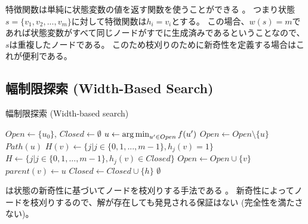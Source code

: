 特徴関数は単純に状態変数の値を返す関数を使うことができる \cite{geffner2015, lipovetzky2015a}。
つまり状態$s = \{v_1, v_2,...,v_m\}$に対して特徴関数は$h_i = v_i$とする。
この場合、$w(s) = m$であれば状態変数がすべて同じノードがすでに生成済みであるということなので、$s$は重複したノードである。
このため枝刈りのために新奇性を定義する場合はこれが便利である。



\subsection{幅制限探索 (Width-Based Search)}
\label{sec:width-based-search}


\begin{algorithm}
\caption{幅制限探索 (Width-based search)}
\label{alg:width-based-search}
	$Open \leftarrow \{u_0\}$, $Closed \leftarrow \emptyset$\;
	 {
                $u \leftarrow \operatorname*{arg\,min}_{u' \in Open} f(u')$ \;
		$Open \leftarrow Open \setminus \{u\} $\;
		 {
			\Return $Path(u)$\;
		}
		 {
                  $H(v) \leftarrow \{j | j \in \{0, 1, ..., m-1\}, h_j(v) = 1\}$\;
                  $H \leftarrow \{j | j \in \{0, 1, ..., m-1\}, h_j(v) \in Closed\}$\;
                   {
                    $Open \leftarrow Open \cup \{v\}$\;
                    $parent(v) \leftarrow u$\;
                  }
                   {
                    $Closed \leftarrow Closed \cup \{h\}$\;
                  }
		}
 	}
	\Return $\emptyset$\;
\end{algorithm}

は状態の新奇性に基づいてノードを枝刈りする手法である \cite{lipovetzkyg12}。
新奇性によってノードを枝刈りするので、解が存在しても発見される保証はない (完全性を満たさない)。

